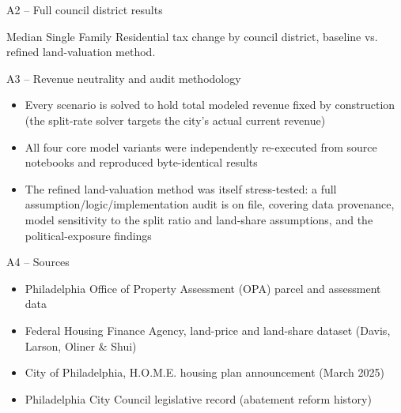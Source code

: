 \documentclass[aspectratio=169,11pt]{beamer}
\begin{document}
\begin{frame}{A2 -- Full council district results}

\vspace{0.6em}
{\footnotesize\color{deckmuted} Median Single Family Residential tax change by council district, baseline vs. refined land-valuation method.}
\end{frame}

\begin{frame}{A3 -- Revenue neutrality and audit methodology}
\begin{itemize}
\item Every scenario is solved to hold total modeled revenue fixed by construction (the split-rate solver targets the city's actual current revenue)
\item All four core model variants were independently re-executed from source notebooks and reproduced byte-identical results
\item The refined land-valuation method was itself stress-tested: a full assumption/logic/implementation audit is on file, covering data provenance, model sensitivity to the split ratio and land-share assumptions, and the political-exposure findings
\end{itemize}
\end{frame}

\begin{frame}{A4 -- Sources}
\begin{itemize}
\item Philadelphia Office of Property Assessment (OPA) parcel and assessment data
\item Federal Housing Finance Agency, land-price and land-share dataset (Davis, Larson, Oliner \& Shui)
\item City of Philadelphia, H.O.M.E. housing plan announcement (March 2025)
\item Philadelphia City Council legislative record (abatement reform history)
\end{itemize}
\end{frame}
\end{document}
